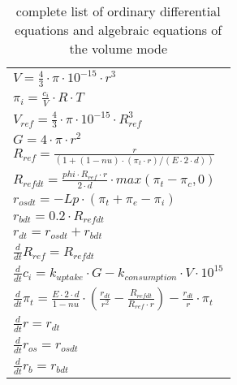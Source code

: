 \begin{table} [h]
	
	\begin{center} 
		\caption{complete list of ordinary differential equations and algebraic equations of the volume mode}
		\begin{tabular} {l}
			\toprule
			$V = \frac{4}{3}\cdot \pi  \cdot 10^{-15} \cdot r^3$ \\
			$\pi_i = \frac{c_i}{V} \cdot R\cdot T$\\
			$V_{ref} =  \frac{4}{3} \cdot \pi \cdot 10^{-15} \cdot R_{ref}^3$\\
			$G = 4 \cdot  \pi \cdot r^2$\\
			$R_{ref} = \frac{r}{(1 + (1 - nu)\cdot (\pi_t \cdot r) / (E\cdot 2\cdot d))} $\\
			$R_{refdt}= \frac{phi\cdot R_{ref}\cdot r }{2\cdot d} \cdot max(\pi_t- \pi_c, 0)$\\
			$r_{osdt }= - Lp\cdot (\pi_t + \pi_e - \pi_i)$\\
			$r_{bdt} = 0.2\cdot R_{refdt}$\\
			$r_{dt} = r_{osdt} + r_{bdt}$  \\
			$\frac{d}{dt} R_{ref} = R_{refdt}$\\
			$\frac{d}{dt}  c_i = k_{uptake}\cdot G - k_{consumption}\cdot V\cdot 10^{15}$\\
			$\frac{d}{dt} \pi_t = \frac{E\cdot 2\cdot d }{1 - nu} \cdot (\frac{r_{dt}}{r^2 } - \frac{R_{refdt}}{R_{ref} \cdot r}) - \frac{r_{dt}}{ r} \cdot \pi_t$\\
			$\frac{d}{dt}  r = r_{dt}$\\
			$\frac{d}{dt} r_{os} = r_{osdt}$\\
			$\frac{d}{dt}  r_b = r_{bdt}$\\
			
			\bottomrule
		\end{tabular}
		\label{equationsVolume}
	\end{center}
\end{table}

\newpage
